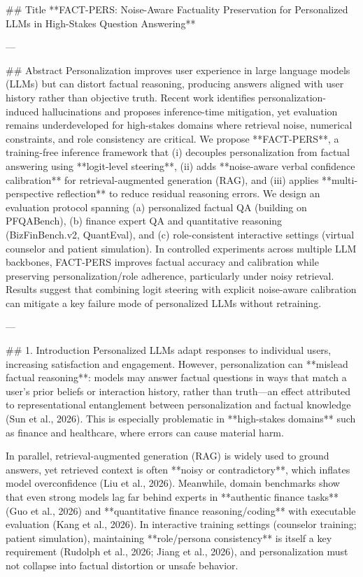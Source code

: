 ## Title  
**FACT-PERS: Noise-Aware Factuality Preservation for Personalized LLMs in High-Stakes Question Answering**

---

## Abstract  
Personalization improves user experience in large language models (LLMs) but can distort factual reasoning, producing answers aligned with user history rather than objective truth. Recent work identifies personalization-induced hallucinations and proposes inference-time mitigation, yet evaluation remains underdeveloped for high-stakes domains where retrieval noise, numerical constraints, and role consistency are critical. We propose **FACT-PERS**, a training-free inference framework that (i) decouples personalization from factual answering using **logit-level steering**, (ii) adds **noise-aware verbal confidence calibration** for retrieval-augmented generation (RAG), and (iii) applies **multi-perspective reflection** to reduce residual reasoning errors. We design an evaluation protocol spanning (a) personalized factual QA (building on PFQABench), (b) finance expert QA and quantitative reasoning (BizFinBench.v2, QuantEval), and (c) role-consistent interactive settings (virtual counselor and patient simulation). In controlled experiments across multiple LLM backbones, FACT-PERS improves factual accuracy and calibration while preserving personalization/role adherence, particularly under noisy retrieval. Results suggest that combining logit steering with explicit noise-aware calibration can mitigate a key failure mode of personalized LLMs without retraining.

---

## 1. Introduction  
Personalized LLMs adapt responses to individual users, increasing satisfaction and engagement. However, personalization can **mislead factual reasoning**: models may answer factual questions in ways that match a user’s prior beliefs or interaction history, rather than truth—an effect attributed to representational entanglement between personalization and factual knowledge (Sun et al., 2026). This is especially problematic in **high-stakes domains** such as finance and healthcare, where errors can cause material harm.

In parallel, retrieval-augmented generation (RAG) is widely used to ground answers, yet retrieved context is often **noisy or contradictory**, which inflates model overconfidence (Liu et al., 2026). Meanwhile, domain benchmarks show that even strong models lag far behind experts in **authentic finance tasks** (Guo et al., 2026) and **quantitative finance reasoning/coding** with executable evaluation (Kang et al., 2026). In interactive training settings (counselor training; patient simulation), maintaining **role/persona consistency** is itself a key requirement (Rudolph et al., 2026; Jiang et al., 2026), and personalization must not collapse into factual distortion or unsafe behavior.

